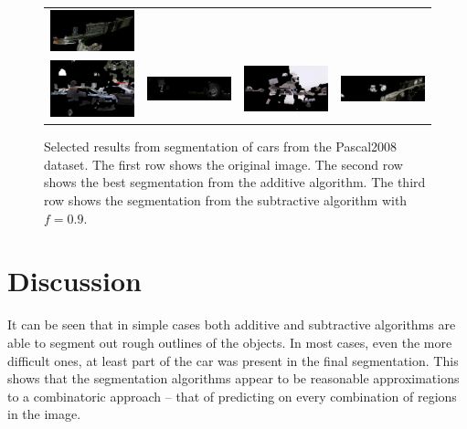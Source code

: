 \documentclass[10pt,twocolumn,letterpaper]{article}
\begin{document}
\begin{figure}[p]
\begin{tabular}{ p{4cm} p{4cm} p{4cm} p{4cm} }
\includegraphics[width=3.95cm]{figures/results/a2008_007529.jpg.eps} \\
\includegraphics[width=3.95cm]{figures/results/b2008_002483.jpg.eps} &
\includegraphics[width=3.95cm]{figures/results/b2008_007466.jpg.eps} &
\includegraphics[width=3.95cm]{figures/results/b2008_005378.jpg.eps} &
\includegraphics[width=3.95cm]{figures/results/b2008_007529.jpg.eps} \\
\end{tabular}
\caption{Selected results from segmentation of cars from the Pascal2008
dataset.  The first row shows the original image.  The second row shows
the best segmentation from the additive algorithm.  The third row shows
the segmentation from the subtractive algorithm with $f=0.9$.}
\label{fig:bad_results}
\end{figure}

\section{Discussion}
\label{sec:discussion}
It can be seen that in simple cases both additive and subtractive algorithms
are able to segment out rough outlines of the objects.  In most cases, even
the more difficult ones, at least part of the car was present in the final
segmentation.  This shows that the segmentation algorithms appear to be
reasonable approximations to a combinatoric approach -- that of predicting
on every combination of regions in the image.
\end{document}
